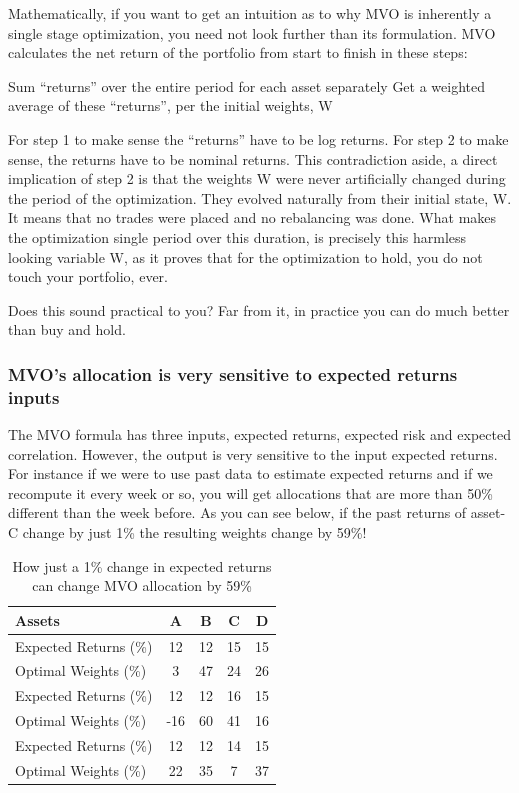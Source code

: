 \documentclass[a4paper]{article}
\begin{document}
Mathematically, if you want to get an intuition as to why MVO is inherently a single stage optimization, you need not look further than its formulation. MVO calculates the net return of the portfolio from start to finish in these steps:


Sum “returns” over the entire period for each asset separately
Get a weighted average of these “returns”, per the initial weights, W


For step 1 to make sense the “returns” have to be log returns. For step 2 to make sense, the returns have to be nominal returns. This contradiction aside, a direct implication of step 2 is that the weights W were never artificially changed during the period of the optimization. They evolved naturally from their initial state, W. It means that no trades were placed and no rebalancing was done. What makes the optimization single period over this duration, is precisely this harmless looking variable W, as it proves that for the optimization to hold, you do not touch your portfolio, ever. 


Does this sound practical to you? Far from it, in practice you can do much better than buy and hold.
\subsubsection{\label{input-senstivity} MVO's allocation is very sensitive to expected returns inputs}

The MVO formula has three inputs, expected returns, expected risk and expected correlation. However, the output is very sensitive to the input expected returns. For instance if we were to use past data to estimate expected returns and if we recompute it every week or so, you will get allocations that are more than 50\% different than the week before. As you can see below, if the past returns of asset-C change by just 1\% the resulting weights change by 59\%!

\begin{table}[h!]
	
	\centering
	\begin{tabular}{lcccc}
		\rowcolor{header}
		\hline
		Assets&
		A&
		B&
		C&
		D\\\hline
		Expected Returns (\%) &
		12&
		12&
		15&
		15\\
		Optimal Weights (\%)&
		3&
		47&
		24&
		26\\
		Expected Returns (\%)&
		12&
		12&
		16&
		15\\
		Optimal Weights (\%)&
		-16&
		60&
		41&
		16\\
		Expected Returns (\%)&
		12&
		12&
		14&
		15\\
		Optimal Weights (\%)&
		22&
		35&
		7&
		37\\\hline
	\end{tabular}
	\caption{\label{tab:senstivity-mvo}How just a 1\% change in expected returns can change MVO allocation by 59\%}
\end{table}
\end{document}

